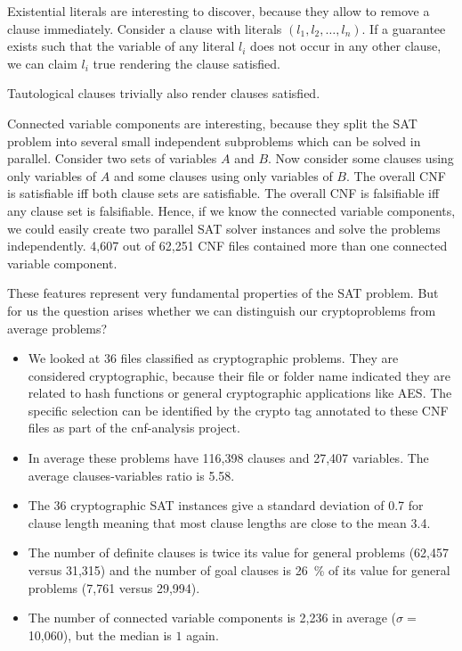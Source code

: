 Existential literals are interesting to discover, because they allow
to remove a clause immediately. Consider a clause with literals
$(l_1, l_2, \ldots, l_n)$. If a guarantee exists such that the variable
of any literal $l_i$ does not occur in any other clause, we can claim
$l_i$ true rendering the clause satisfied.

Tautological clauses trivially also render clauses satisfied.

Connected variable components are interesting, because they split the
SAT problem into several small independent subproblems which can be 
solved in parallel.
Consider two sets of variables $A$ and $B$. Now consider some clauses
using only variables of $A$ and some clauses using only variables of $B$.
The overall CNF is satisfiable iff both clause sets are satisfiable.
The overall CNF is falsifiable iff any clause set is falsifiable.
Hence, if we know the connected variable components, we could easily
create two parallel SAT solver instances and solve the problems
independently. 4,607 out of 62,251 CNF files contained more than one
connected variable component.

These features represent very fundamental properties of the SAT problem.
But for us the question arises whether we can distinguish our cryptoproblems
from average problems?

\begin{itemize}
\item We looked at 36 files classified as cryptographic problems.
  They are considered cryptographic, because their file or folder name
  indicated they are related to hash functions or general cryptographic
  applications like AES. The specific selection can be identified by
  the crypto tag annotated to these CNF files as part of the cnf-analysis
  project.
\item In average these problems have 116,398 clauses and 27,407 variables.
  The average clauses-variables ratio is 5.58.
\item The 36 cryptographic SAT instances give a standard deviation of 0.7
  for clause length meaning that most clause lengths are close to
  the mean 3.4.
\item The number of definite clauses is twice its value for general problems
  (62,457 versus 31,315) and the number of goal clauses is 26~\% of its
  value for general problems (7,761 versus 29,994).
\item The number of connected variable components is 2,236 in average
  ($\sigma =$ 10,060), but the median is $1$ again.
\end{itemize}

